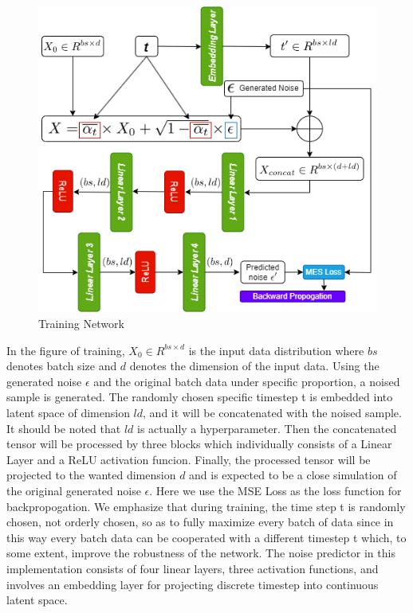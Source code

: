 \documentclass[11pt]{article}
\begin{document}
\begin{figure}
    \centering
    \begin{minipage}{0.5\textwidth}
        \includegraphics[width=\textwidth]{image/training_network.png}
        \caption{Training Network}
    \end{minipage}
\end{figure}

In the figure of training, \(X_0 \in R^{bs \times d}\) is the input data
distribution where \(bs\) denotes batch size and \(d\) denotes the
dimension of the input data. Using the generated noise \(\epsilon\) and
the original batch data under specific proportion, a noised sample is
generated. The randomly chosen specific timestep t is embedded into
latent space of dimension \(ld\), and it will be concatenated with the
noised sample. It should be noted that \(ld\) is actually a
hyperparameter. Then the concatenated tensor will be processed by three
blocks which individually consists of a Linear Layer and a ReLU
activation funcion. Finally, the processed tensor will be projected to
the wanted dimension \(d\) and is expected to be a close simulation of
the original generated noise \(\epsilon\). Here we use the MSE Loss as
the loss function for backpropogation. We emphasize that during
training, the time step t is randomly chosen, not orderly chosen, so as
to fully maximize every batch of data since in this way every batch data
can be cooperated with a different timestep t which, to some extent,
improve the robustness of the network. The noise predictor in this
implementation consists of four linear layers, three activation
functions, and involves an embedding layer for projecting discrete
timestep into continuous latent space.
\end{document}
